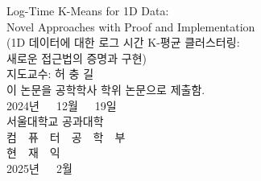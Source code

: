 \begin{center}
    \vspace*{-1.0cm}
    \fontsize{24pt}{30pt}\selectfont Log-Time K-Means for 1D Data: \\
    \fontsize{20pt}{24pt}\selectfont Novel Approaches with Proof and Implementation \\
    \vspace{0.5cm}
    \fontsize{18pt}{22pt}\selectfont (1D 데이터에 대한 로그 시간 K-평균 클러스터링: \\
    새로운 접근법의 증명과 구현) \\
    \vspace{2cm}
    \fontsize{18pt}{18pt}\selectfont
    지도교수: 허 충 길 \\
    \vspace{2cm}
    \fontsize{20pt}{20pt}\selectfont
    이 논문을 공학학사 학위 논문으로 제출함. \\
    \vspace{2cm}
    \fontsize{18pt}{18pt}\selectfont
    2024년~~~12월~~~19일 \\
    \vfill
    \fontsize{20pt}{20pt}\selectfont
    서울대학교 공과대학 \\
    컴~~퓨~~터~~공~~학~~부 \\
    현~~재~~익 \\
    \vspace{2cm}
    \fontsize{20pt}{20pt}\selectfont
    2025년~~~2월 \\
\end{center}
